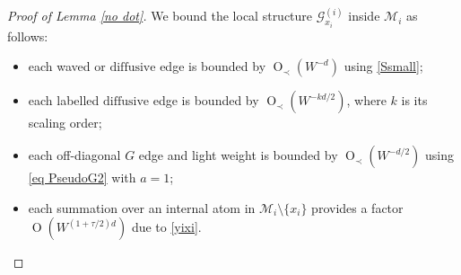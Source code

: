 \documentclass{article}
\newcommand{\1}{\mathds{1}}
\numberwithin{equation}{section}
\renewcommand{\cal}{\mathcal}
\newcommand{\dashed}{\text{diffusive}}
\newcommand{\abs}{{\rm abs}}%
\DeclareMathOperator{\OO}{O}
\theoremstyle{plain} %
\theoremstyle{remark}
\begin{document}
\begin{proof} [Proof of Lemma \ref{no dot}]
We bound the local structure $\cal G_{x_i}^{(i)}$ inside $\cal M_i$ as follows: 
\begin{itemize}
\item each waved or $\dashed$ edge is bounded by $\OO_\prec(W^{-d })$ using \eqref{Ssmall}; %
\item each labelled $\dashed$ edge is bounded by $\OO_\prec (W^{-kd/2 })$, where $k$ is its scaling order; %
\item each off-diagonal $G$ edge and light weight is bounded by $\OO_\prec(W^{-d/2})$ using \eqref{eq PseudoG2} with $a=1$; %
\item each summation over an internal atom in $\cal M_i \setminus \{x_i\}$ provides a factor $\OO( W^{(1+\tau/2)d})$ due to \eqref{yixi}. 
\end{itemize}

\end{proof}
\end{document}
